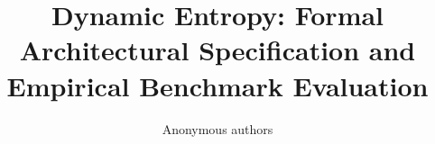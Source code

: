 \title{\textbf{Dynamic Entropy: Formal Architectural Specification and Empirical Benchmark Evaluation}}

\author{Anonymous authors}
